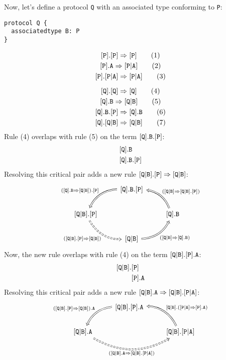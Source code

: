 \documentclass[../generics]{subfiles}
\begin{document}
\begin{example}
Now, let's define a protocol \texttt{Q} with an associated type conforming to \texttt{P}:
\begin{Verbatim}
protocol Q {
  associatedtype B: P
}
\end{Verbatim}
\begin{gather*}
\ProtoConf{\protosym{P}}{P}\tag{1}\\
\AssocIntro{P}{A}\tag{2}\\
\protosym{P}.\assocsym{P}{A}\Rightarrow\assocsym{P}{A}\tag{3}\\[\medskipamount]
\ProtoConf{\protosym{Q}}{Q}\tag{4}\\
\AssocIntro{Q}{B}\tag{5}\\
\ProtoConf{\protosym{Q}.\texttt{B}}{P}\tag{6}\\
\protosym{Q}.\assocsym{Q}{B}\Rightarrow\assocsym{Q}{B}\tag{7}
\end{gather*}
Rule (4) overlaps with rule (5) on the term $[\texttt{Q}].\texttt{B}.[\texttt{P}]$:
\begin{align*}
&[\texttt{Q}].\texttt{B}\\
&[\texttt{Q}].\texttt{B}.[\texttt{P}]
\end{align*}
Resolving this critical pair adds a new rule $[\texttt{Q}|\texttt{B}].[\texttt{P}]\Rightarrow [\texttt{Q}|\texttt{B}]$:
\[
\FourLoopDerived%
{\protosym{Q}.\texttt{B}.\protosym{P}}%
{\assocsym{Q}{B}.\protosym{P}}%
{\assocsym{Q}{B}}%
{\protosym{Q}.\texttt{B}}%
{(\AssocIntro{Q}{B}).\protosym{P}}%
{(\ProtoConf{\assocsym{Q}{B}}{P})}%
{(\AssocIntroInv{Q}{B})}%
{(\ProtoConfInv{\assocsym{Q}{B}}{P})}
\]
Now, the new rule overlaps with rule (4) on the term $[\texttt{Q}|\texttt{B}].[\texttt{P}].\texttt{A}$:
\begin{align*}
[\texttt{Q}|\texttt{B}].&[\texttt{P}]\\
&[\texttt{P}].\texttt{A}
\end{align*}
Resolving this critical pair adds a new rule $[\texttt{Q}|\texttt{B}].\texttt{A}\Rightarrow[\texttt{Q}|\texttt{B}].[\texttt{P}|\texttt{A}]$:
\[
\begin{tikzcd}
&\assocsym{Q}{B}.\protosym{P}.\texttt{A}
\arrow[ld, Rightarrow, bend right, "(\ProtoConf{\assocsym{Q}{B}}{P}).\texttt{A}"']\\
\assocsym{Q}{B}.\texttt{A}\arrow[rr, Rightarrow, bend right, dashed, "(\assocsym{Q}{B}.\texttt{A}\Rightarrow\assocsym{Q}{B}.\assocsym{P}{A})"']
&&
\assocsym{Q}{B}.\assocsym{P}{A}\arrow[lu, Rightarrow, bend right, "\assocsym{Q}{B}.(\AssocIntroInv{P}{A})"']
\end{tikzcd}
\]
\end{example}
\end{document}
